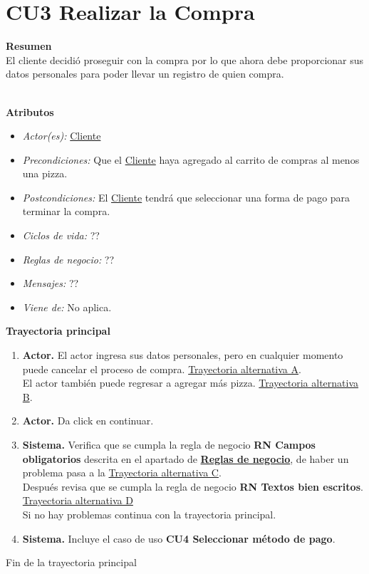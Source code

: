 \hypertarget{CU3}{}
\section{CU3 Realizar la Compra}

\noindent \textbf{Resumen}\\

El cliente decidió proseguir con la compra por lo que ahora debe proporcionar sus datos personales para poder llevar un registro de quien compra.

\noindent \textbf{\\Atributos}

\begin{itemize}
	
	\item \textit{Actor(es):} \hyperlink{A:Cliente}{Cliente}
	\item \textit{Precondiciones:} Que el \hyperlink{A:Cliente}{Cliente} haya agregado al carrito de compras al menos una pizza.
	\item \textit{Postcondiciones:} El \hyperlink{A:Cliente}{Cliente} tendrá que seleccionar una forma de pago para terminar la compra.
	\item \textit{Ciclos de vida:} ?? 
	\item \textit{Reglas de negocio:} ??
	\item \textit{Mensajes:} ??
	\item \textit{Viene de:} No aplica.
	
\end{itemize} 

\noindent \textbf{Trayectoria principal}

\begin{enumerate}
	\item {\textbf{Actor.}} El actor ingresa sus datos personales, pero en cualquier momento puede cancelar el proceso de compra. \hyperlink{CU3:TAA}{Trayectoria alternativa A}.
	\\ El actor también puede regresar a agregar más pizza. \hyperlink{CU3:TAA}{Trayectoria alternativa B}.
	\\
	
	\item {\textbf{Actor.}} Da click en continuar.
	
	\item \textbf{Sistema.} Verifica que se cumpla la regla de negocio \textbf{RN Campos obligatorios} descrita en el apartado de \hyperlink{RN}{\textbf{Reglas de negocio}}, de haber un problema pasa a la \hyperlink{CU3:TAC}{Trayectoria alternativa C}.
	\\Después revisa que se cumpla la regla de negocio \textbf{RN Textos bien escritos}. \hyperlink{CU3:TAD}{Trayectoria alternativa D}
	\\Si no hay problemas continua con la trayectoria principal.
	
	\item \textbf{Sistema.} Incluye el caso de uso \textbf{CU4 Seleccionar método de pago}.
	
	
\end{enumerate}	
Fin de la trayectoria principal
\\

